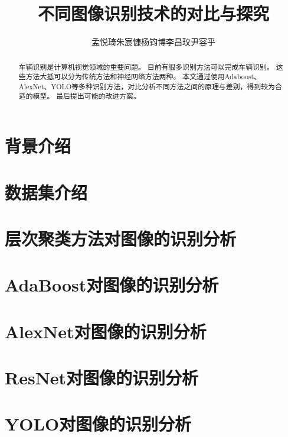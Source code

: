 \documentclass[UTF8]{ctexart}
\title{不同图像识别技术的对比与探究}
\author{孟悦琦\quad 朱宸慷\quad 杨钧博\quad 李昌玟\quad 尹容乎}
\begin{document}
\maketitle

\begin{abstract}
    车辆识别是计算机视觉领域的重要问题。
    目前有很多识别方法可以完成车辆识别。
    这些方法大抵可以分为传统方法和神经网络方法两种。
    本文通过使用Adaboost、AlexNet、YOLO等多种识别方法，对比分析不同方法之间的原理与差别，得到较为合适的模型。
    最后提出可能的改进方案。 \par
\end{abstract}

\section{背景介绍}


\section{数据集介绍}



\section{层次聚类方法对图像的识别分析}





\section{AdaBoost对图像的识别分析}


\section{AlexNet对图像的识别分析}


\section{ResNet对图像的识别分析}


\section{YOLO对图像的识别分析}






\newpage
\small



\end{document}
